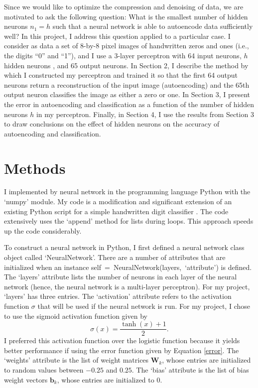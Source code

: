 \documentclass[12pt]{article}
\newcommand{\vecb}{\mathbf{b}}
\newcommand{\matW}{\mathbf{W}}
\begin{document}
Since we would like to optimize the compression and denoising of data, we are motivated to ask the following question: What is the smallest number of hidden neurons $n_1=h$ such that a neural network is able to autoencode data sufficiently well? In this project, I address this question applied to a particular case. I consider as data a set of 8-by-8 pixel images of handwritten zeros and ones (i.e., the digits ``0'' and ``1''), and I use a 3-layer perceptron with 64 input neurons, $h$ hidden neurons , and 65 output neurons. In Section 2, I describe the method by which I constructed my perceptron and trained it so that the first 64 output neurons return a reconstruction of the input image (autoencoding) and the 65th output neuron classifies the image as either a zero or one. In Section 3, I present the error in autoencoding and classification as a function of the number of hidden neurons $h$ in my perceptron. Finally, in Section 4, I use the results from Section 3 to draw conclusions on the effect of hidden neurons on the accuracy of autoencoding and classification.

\section{Methods}

I implemented by neural network in the programming language Python with the `numpy' module. My code is a modification and significant extension of an existing Python script for a simple handwritten digit classifier \cite{code}. The code extensively uses the `append' method for lists during loops. This approach speeds up the code considerably.

To construct a neural network in Python, I first defined a neural network class object called `NeuralNetwork'. There are a number of attributes that are initialized when an instance self~=~NeuralNetwork(layers,~`attribute') is defined. The `layers' attribute lists the number of neurons in each layer of the neural network (hence, the neural network is a multi-layer perceptron). For my project, `layers' has three entries. The `activation' attribute refers to the activation function $\sigma$ that will be used if the neural network is run. For my project, I chose to use the sigmoid activation function given by
\[ \sigma(x) = \frac{\tanh(x)+1}{2}. \]
I preferred this activation function over the logistic function because it yields better performance if using the error function given by Equation \eqref{error}. The `weights' attribute is the list of weight matrices $\matW_k$, whose entries are initialized to random values between $-0.25$ and $0.25$. The `bias' attribute is the list of bias weight vectors $\vecb_k$, whose entries are initialized to $0$.
\end{document}
